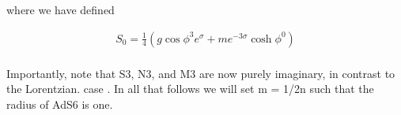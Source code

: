 \documentclass{article}
\begin{document}
where we have defined


\begin{equation}
\begin{array} { c } { S _ { 0 } = \frac { 1 } { 4 } \left ( g \cos \phi ^ { 3 } e ^ { \sigma } + m e ^ { - 3 \sigma } \cosh \phi ^ { 0 } \right ) } \\ { \qquad }\end{array}
\end{equation}


Importantly, note that S3, N3, and M3 are now purely imaginary, in contrast to the Lorentzian.
case . In all that follows we will set m = 1/2n such that the radius of AdS6 is one.
\end{document}
